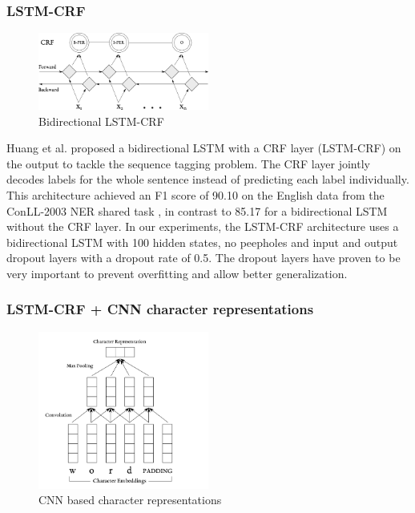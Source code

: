 \documentclass{nle}
\begin{document}
\subsubsection{LSTM-CRF}
\label{sssec:lstm_crf}

\begin{figure}
  \centering
  \includegraphics[width=0.5\textwidth]{pics/bi_lstm_crf}
  \caption{Bidirectional LSTM-CRF}
  \label{fig:bi_lstm_crf}
\end{figure}

Huang et al. \cite{Huang2015} proposed a bidirectional LSTM with a CRF layer (LSTM-CRF) on the output to tackle
the sequence tagging problem. The CRF layer jointly decodes labels for the whole sentence instead
of predicting each label individually. This architecture achieved an F1 score of 90.10 on the English
data from the ConLL-2003 NER shared task \cite{Sang2003}, in contrast to 85.17 for a bidirectional LSTM without the CRF layer. 
In our experiments, the LSTM-CRF architecture uses a bidirectional LSTM with 100 
hidden states, no peepholes and input and output dropout layers with a dropout
rate of 0.5. The dropout layers have proven to be very important to prevent overfitting 
and allow better generalization.

\subsubsection{LSTM-CRF + CNN character representations}
\label{sssec:lstm_crf_cnn}

\begin{figure}
  \centering
	  \includegraphics[width=0.5\textwidth]{pics/cnn}
  \caption{CNN based character representations}
  \label{fig:cnn}
\end{figure}
\end{document}
